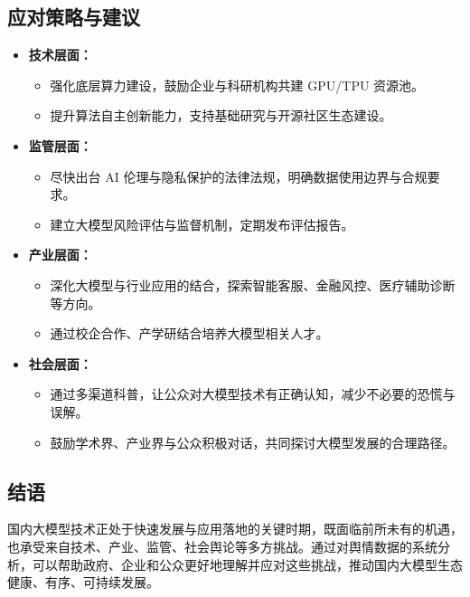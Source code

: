 \documentclass[12pt,a4paper]{ctexart}
\begin{document}
\subsection{应对策略与建议}
\begin{itemize}
    \item \textbf{技术层面：}
    \begin{itemize}
        \item 强化底层算力建设，鼓励企业与科研机构共建 GPU/TPU 资源池。
        \item 提升算法自主创新能力，支持基础研究与开源社区生态建设。
    \end{itemize}
    \item \textbf{监管层面：}
    \begin{itemize}
        \item 尽快出台 AI 伦理与隐私保护的法律法规，明确数据使用边界与合规要求。
        \item 建立大模型风险评估与监督机制，定期发布评估报告。
    \end{itemize}
    \item \textbf{产业层面：}
    \begin{itemize}
        \item 深化大模型与行业应用的结合，探索智能客服、金融风控、医疗辅助诊断等方向。
        \item 通过校企合作、产学研结合培养大模型相关人才。
    \end{itemize}
    \item \textbf{社会层面：}
    \begin{itemize}
        \item 通过多渠道科普，让公众对大模型技术有正确认知，减少不必要的恐慌与误解。
        \item 鼓励学术界、产业界与公众积极对话，共同探讨大模型发展的合理路径。
    \end{itemize}
\end{itemize}

\subsection{结语}
国内大模型技术正处于快速发展与应用落地的关键时期，既面临前所未有的机遇，也承受来自技术、产业、监管、社会舆论等多方挑战。通过对舆情数据的系统分析，可以帮助政府、企业和公众更好地理解并应对这些挑战，推动国内大模型生态健康、有序、可持续发展。
\end{document}
